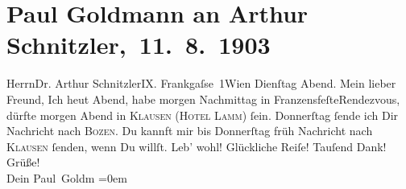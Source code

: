 

         
         \renewcommand{\erwaehntePersonen}{Personen: Theodore Rottenberg}
         \renewcommand{\erwaehnteOrte}{Orte: Bozen, Frankgasse, Franzensfeste, Gasthof zum Lamm, Klausen (Südtirol), Wien}
         \renewcommand{\erwaehnteWerke}{}
               \section[ Paul Goldmann an Arthur Schnitzler, 11. 8. 1903]{ Paul Goldmann an Arthur Schnitzler, 11. 8. 1903}\nopagebreak{}\rehead{ }\begin{ledgroupsized}[t]{13cm}\normalsize\beginnumbering \toendnotes[C]{\smallbreak\pagebreak[2]} 
\toendnotes[C]{\smallbreak}\pstart{}{\pb}Herrn\pend{}\pstart{}Dr. Arthur Schnitzler\pend{}\pstart{}IX. Frankgaſse 1\pend{}\pstart{}Wien\pend{}{\bigskip}\pstart
           {\pb}Dienſtag{ }Abend.\pend
           \pstart{}Mein lieber Freund,\pend\pstart
           Ich \label{K_L03383-1v}\label{K_L03383-1h}{ }heut{ }Abend, habe morgen{ }Nachmittag in FranzensfeſteRendezvous, dürfte morgen{ }Abend in \textsc{Klausen} (\textsc{Hotel Lamm}) ſein. Donnerſtag ſende ich Dir Nachricht nach
                  \textsc{Bozen}. Du kannft mir bis Donnerſtag{ }früh Nachricht nach \textsc{Klausen} ſenden, wenn Du willſt.\pend
           \pstart
           Leb’ wohl! Glückliche Reiſe! Tauſend Dank! Grüße! {\\[\baselineskip]}Dein \spacefill\mbox{Paul
                  Goldm}\pend
           \leftskip=0em{}
         
         \endnumbering{}\end{ledgroupsized}  \newcommand{\dateiname}{L03383}\newcommand{\titel}{Paul Goldmann an Arthur Schnitzler, 11. 8. 1903}\newcommand{\editorInnen}{Martin Anton Müller und Laura Untner}
      